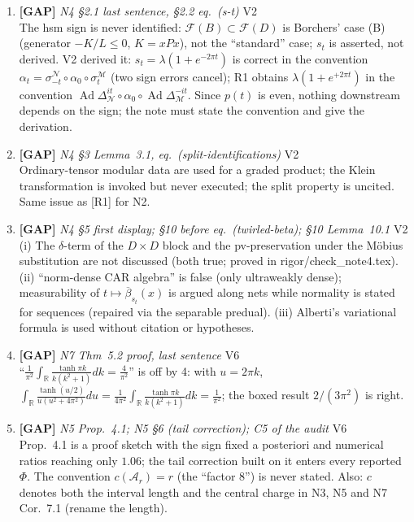\documentclass[11pt]{article}
\begin{document}
\begin{enumerate}[leftmargin=1.6em,itemsep=6pt]
\item \textbf{[GAP]} \emph{N4 \S2.1 last sentence, \S2.2 eq.\ (s-t)} \hfill\textsc{V2}\\ The hsm sign is never identified: \(\mathcal F(B)\subset\mathcal F(D)\) is Borchers' case (B) (generator \(-K/L\le0\), \(K=xPx\)), not the ``standard'' case; \(s_t\) is asserted, not derived. V2 derived it: \(s_t=\lambda(1+e^{-2\pi t})\) is correct in the convention \(\alpha_t=\sigma^{\mathcal N}_{-t}\circ\alpha_0\circ\sigma^{\mathcal M}_t\) (two sign errors cancel); R1 obtains \(\lambda(1+e^{+2\pi t})\) in the convention \(\operatorname{Ad}\Delta_{\mathcal N}^{it}\circ\alpha_0\circ\operatorname{Ad}\Delta_{\mathcal M}^{-it}\). Since \(p(t)\) is even, nothing downstream depends on the sign; the note must state the convention and give the derivation.
\item \textbf{[GAP]} \emph{N4 \S3 Lemma~3.1, eq.\ (split-identifications)} \hfill\textsc{V2}\\ Ordinary-tensor modular data are used for a graded product; the Klein transformation is invoked but never executed; the split property is uncited. Same issue as [R1] for N2.
\item \textbf{[GAP]} \emph{N4 \S5 first display; \S10 before eq.\ (twirled-beta); \S10 Lemma~10.1} \hfill\textsc{V2}\\ (i) The \(\delta\)-term of the \(D\times D\) block and the pv-preservation under the M\"obius substitution are not discussed (both true; proved in rigor/check\_note4.tex). (ii) ``norm-dense CAR algebra'' is false (only ultraweakly dense); measurability of \(t\mapsto\overline\beta_{s_t}(x)\) is argued along nets while normality is stated for sequences (repaired via the separable predual). (iii) Alberti's variational formula is used without citation or hypotheses.
\item \textbf{[GAP]} \emph{N7 Thm~5.2 proof, last sentence} \hfill\textsc{V6}\\ ``\(\frac1{\pi^2}\int_{\mathbb R}\frac{\tanh\pi k}{k(k^2+1)}dk=\frac4{\pi^2}\)'' is off by 4: with \(u=2\pi k\), \(\int_{\mathbb R}\frac{\tanh(u/2)}{u(u^2+4\pi^2)}du=\frac1{4\pi^2}\int_{\mathbb R}\frac{\tanh\pi k}{k(k^2+1)}dk=\frac1{\pi^2}\); the boxed result \(2/(3\pi^2)\) is right.
\item \textbf{[GAP]} \emph{N5 Prop.~4.1; N5 \S6 (tail correction); C5 of the audit} \hfill\textsc{V6}\\ Prop.~4.1 is a proof sketch with the sign fixed a posteriori and numerical ratios reaching only \(1.06\); the tail correction built on it enters every reported \(\Phi\). The convention \(c(\mathcal A_r)=r\) (the ``factor 8'') is never stated. Also: \(c\) denotes both the interval length and the central charge in N3, N5 and N7 Cor.~7.1 (rename the length).

\end{enumerate}
\end{document}
